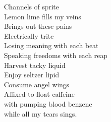 Channels of sprite\\
Lemon lime fills my veins\\
Brings out these pains\\
Electrically trite\\
Losing meaning with each beat\\
Speaking freedoms with each reap\\
Harvest tacky liquid\\
Enjoy seltzer lipid\\
Consume angel wings\\
Affixed to float caffeine\\
with pumping blood benzene\\
while all my tears sings.\\

